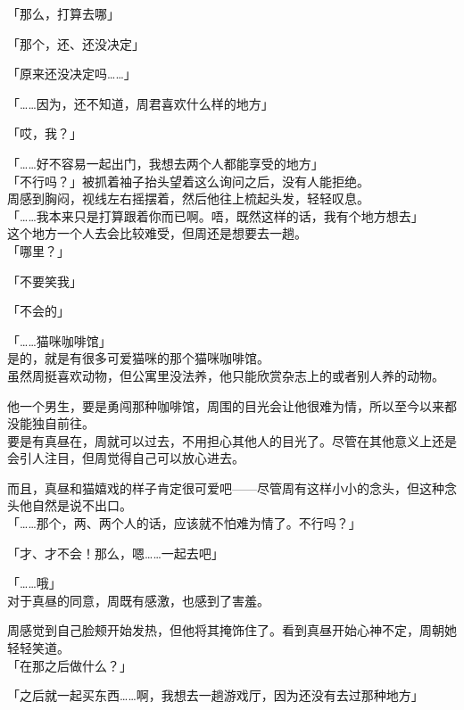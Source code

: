 「那么，打算去哪」

「那个，还、还没决定」

「原来还没决定吗……」

「……因为，还不知道，周君喜欢什么样的地方」

「哎，我？」

「……好不容易一起出门，我想去两个人都能享受的地方」\\

「不行吗？」被抓着袖子抬头望着这么询问之后，没有人能拒绝。\\

周感到胸闷，视线左右摇摆着，然后他往上梳起头发，轻轻叹息。\\

「……我本来只是打算跟着你而已啊。唔，既然这样的话，我有个地方想去」\\

这个地方一个人去会比较难受，但周还是想要去一趟。\\

「哪里？」

「不要笑我」

「不会的」

「……猫咪咖啡馆」\\

是的，就是有很多可爱猫咪的那个猫咪咖啡馆。\\

虽然周挺喜欢动物，但公寓里没法养，他只能欣赏杂志上的或者别人养的动物。

他一个男生，要是勇闯那种咖啡馆，周围的目光会让他很难为情，所以至今以来都没能独自前往。\\

要是有真昼在，周就可以过去，不用担心其他人的目光了。尽管在其他意义上还是会引人注目，但周觉得自己可以放心进去。

而且，真昼和猫嬉戏的样子肯定很可爱吧——尽管周有这样小小的念头，但这种念头他自然是说不出口。\\

「……那个，两、两个人的话，应该就不怕难为情了。不行吗？」

「才、才不会！那么，嗯……一起去吧」

「……哦」\\

对于真昼的同意，周既有感激，也感到了害羞。

周感觉到自己脸颊开始发热，但他将其掩饰住了。看到真昼开始心神不定，周朝她轻轻笑道。\\

「在那之后做什么？」

「之后就一起买东西……啊，我想去一趟游戏厅，因为还没有去过那种地方」\\

